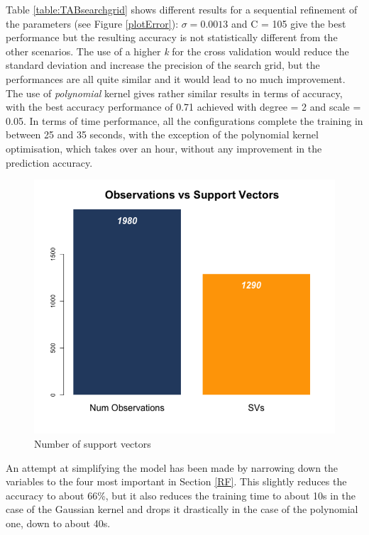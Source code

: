 \documentclass [a4paper,12 pt]{article}
\begin{document}
Table \ref{table:TABsearchgrid} shows different results for a sequential refinement of the parameters (see Figure \ref{plotError}): $\sigma = 0.0013$ and C = 105 give the best performance but the resulting accuracy is not statistically different from the other scenarios. The use of a higher \emph{k} for the cross validation would reduce the standard deviation and increase the precision of the search grid, but the performances are all quite similar and it would lead to no much improvement. The use of \emph{polynomial} kernel gives rather similar results in terms of accuracy, with the best accuracy performance of 0.71 achieved with degree = 2 and scale = 0.05.
In terms of time performance, all the configurations complete the training in between 25 and 35 seconds, with the exception of the polynomial kernel optimisation, which takes over an hour, without any improvement in the prediction accuracy.

\begin{figure}
\begin{center}
\vspace{-20pt}
\includegraphics[viewport=25 50 800 650,clip,scale=0.26]{Figures/SVM_supportVectors.png}
\caption{Number of support vectors}\label{barplotM4}				
\end{center}
\end{figure}

An attempt at simplifying the model has been made by narrowing down the variables to the four most important in Section \ref{RF}. This slightly reduces the accuracy to about 66\%, but it also reduces the training time to about 10s in the case of the Gaussian kernel and drops it drastically in the case of the polynomial one, down to about 40s.
\end{document}
